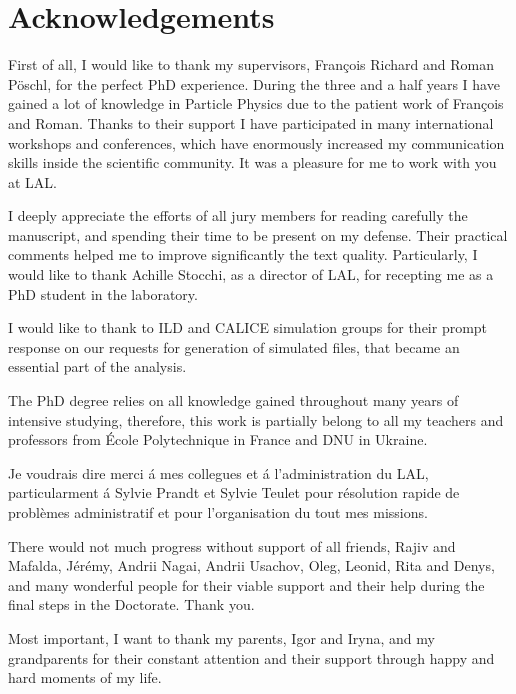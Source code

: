 \section*{Acknowledgements}
First of all, I would like to thank my supervisors, Fran\c cois Richard and Roman P\"oschl, for the perfect PhD experience. 
During the three and a half years I have gained a lot of knowledge in Particle Physics due to the patient work of Fran\c cois and Roman. 
Thanks to their support I have participated in many international workshops and conferences, which have enormously increased my communication skills inside the scientific community. 
It was a pleasure for me to work with you at LAL. 


I deeply appreciate the efforts of all jury members for reading carefully the manuscript, and spending their time to be present on my defense. Their practical comments helped me to improve significantly the text quality. 
Particularly, I would like to thank Achille Stocchi, as a director of LAL, for  recepting me as a PhD student in the laboratory.

I would like to thank to ILD and CALICE simulation groups for their prompt response on our requests for generation of simulated files, that became an essential part of the analysis. 

The PhD degree relies on all knowledge gained throughout many years of intensive studying, therefore, this work is partially belong to all my teachers and professors from \'Ecole Polytechnique in France and DNU in Ukraine. 

Je voudrais dire merci \'a mes collegues et \'a l'administration du LAL, particularment \'a Sylvie Prandt et Sylvie Teulet pour résolution rapide de problèmes administratif et pour l'organisation du tout mes missions.

There would not much progress without support of all friends, Rajiv and Mafalda, J\'er\'emy, Andrii Nagai, Andrii Usachov, Oleg, Leonid, Rita and Denys, and many wonderful people for their viable support and their help during the final steps in the Doctorate. Thank you. 

Most important, I want to thank my parents, Igor and Iryna, and my grandparents for their constant attention and their support through happy and hard moments of my life.  